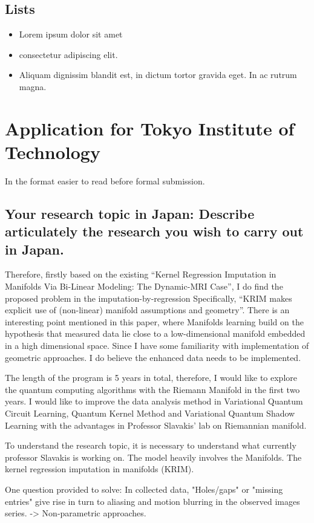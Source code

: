 \documentclass{article}
\begin{document}
\subsection{Lists}
\begin{itemize}
\item Lorem ipsum dolor sit amet
\item consectetur adipiscing elit. 
\item Aliquam dignissim blandit est, in dictum tortor gravida eget. In ac rutrum magna.
\end{itemize}

\section{Application for Tokyo Institute of Technology}
In the format easier to read before formal submission.
\subsection{Your research topic in Japan: 
Describe articulately the research you wish 
to carry out in Japan.}

Therefore, firstly based on the 
existing “Kernel Regression Imputation in 
Manifolds Via Bi-Linear Modeling: The Dynamic-MRI Case”, 
I do find the proposed problem in the imputation-by-regression 
Specifically, “KRIM makes explicit use of 
(non-linear) manifold assumptions and geometry”. 
There is an interesting point mentioned in this paper, 
where Manifolds learning build on the hypothesis 
that measured data lie close to a low-dimensional 
manifold embedded in a high dimensional space.  
Since I have some familiarity with implementation 
of geometric approaches. I do believe the enhanced data needs 
to be implemented. 

The length of the program is 5 years in total, therefore,
 I would like to explore the quantum computing algorithms 
 with the Riemann Manifold in the first two years. 
 I would like to improve the data analysis method in 
 Variational Quantum Circuit Learning, Quantum Kernel Method 
 and Variational Quantum Shadow Learning with the advantages 
 in Professor Slavakis' lab on Riemannian manifold. 

To understand the research topic, it is necessary to understand what 
currently professor Slavakis is working on. The model heavily involves 
the Manifolds. The kernel regression imputation in manifolds (KRIM).

One question provided to solve: In collected data, "Holes/gaps" or 
"missing entries" give rise in turn to aliasing and motion blurring 
in the observed images series. -> Non-parametric approaches. 
\end{document}
